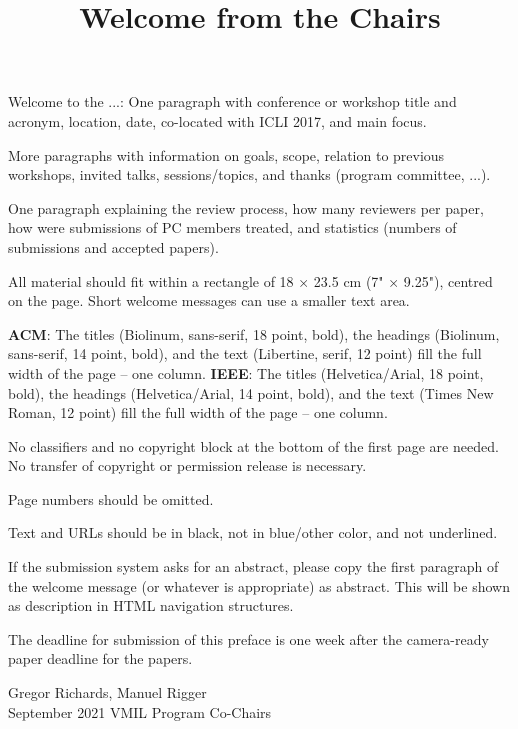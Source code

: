 \documentclass[12pt,letterpaper]{article}
\begin{document}
\title{\sffamily\bfseries Welcome from the Chairs}
\date{}

\maketitle
\thispagestyle{empty}
\pagestyle{empty}

Welcome to the ...: One paragraph with conference or workshop title and acronym, location, date, co-located with ICLI 2017, and main focus.

More paragraphs with information on goals, scope, relation to previous workshops, invited talks, sessions/topics, and thanks (program committee, ...).

One paragraph explaining the review process, how many reviewers per paper, how were submissions of PC members treated, and statistics (numbers of submissions and accepted papers).

All material should fit within a rectangle of 18 × 23.5 cm (7" × 9.25"), centred on the page. Short welcome messages can use a smaller text area.

\textbf{ACM}: The titles (Biolinum, sans-serif, 18 point, bold), the headings (Biolinum, sans-serif, 14 point, bold), 
and the text (Libertine, serif, 12 point) fill the full width of the page – one column.
\textbf{IEEE}: The titles (Helvetica/Arial, 18 point, bold), the headings (Helvetica/Arial, 14 point, bold), 
and the text (Times New Roman, 12 point) fill the full width of the page – one column.

No classifiers and no copyright block at the bottom of the first page are needed. No transfer of copyright or permission release is necessary.

Page numbers should be omitted.

Text and URLs should be in black, not in blue/other color, and not underlined.

If the submission system asks for an abstract, please copy the first paragraph of the welcome message (or whatever is appropriate) as abstract. This will be shown as description in HTML navigation structures.

The deadline for submission of this preface is one week after the camera-ready paper deadline for the papers.

\bigskip
\noindent
       \hfill Gregor Richards, Manuel Rigger\\
September 2021 \hfill VMIL Program Co-Chairs
\end{document}
